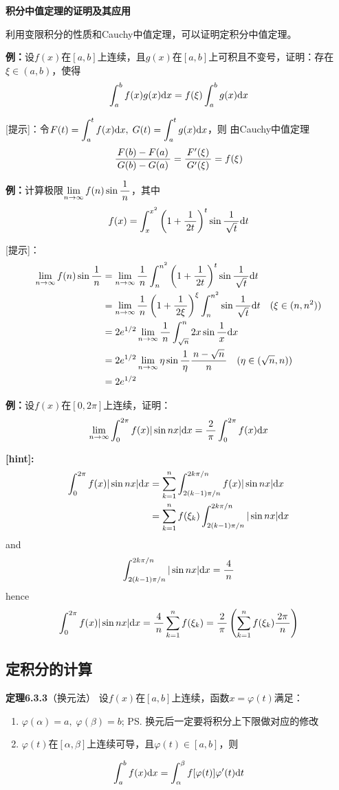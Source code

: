 \begin{shaded}
	{\bf 积分中值定理的证明及其应用}
	
	利用变限积分的性质和Cauchy中值定理，可以证明定积分中值定理。

	{\bf 例：}设$f(x)$在$[a,b]$上连续，且$g(x)$在$[a,b]$上可积且不变号，证明：存在
	$\xi\in(a,b)$，使得
	$$\dint_a^bf(x)g(x)\d x=f(\xi)\dint_a^bg(x)\d x$$
	
	[提示]：令$F(t)=\dint_a^tf(x)\d x,\;G(t)=\dint_a^tg(x)\d x$，则
	由Cauchy中值定理
	$$\df{F(b)-F(a)}{G(b)-G(a)}=\df{F'(\xi)}{G'(\xi)}=f(\xi)$$
	
	{\bf 例：}计算极限$\limn f(n)\sin\df 1n$，其中
	  $$f(x)=\dint_x^{x^2}\left(1+\df 1{2t}\right)^t\sin\df{1}{\sqrt t}\d t$$
	
	[提示]：
	\begin{align}
		\limn f(n)\sin\df 1n&=\limn\df1n\dint_n^{n^2}\left(1+\df
		1{2t}\right)^t\sin\df{1}{\sqrt t}\d t\notag\\
		&=\limn\df1n\left(1+\df1{2\xi}\right)^{\xi}\dint_n^{n^2}
		\sin\df1{\sqrt t}\d t\quad(\xi\in(n,n^2))\notag\\
		&=2e^{1/2}\limn\df1n\dint_{\sqrt n}^n2x\sin\df1x\d x\notag\\
		&=2e^{1/2}\limn\eta\sin\df1{\eta}\df{n-\sqrt n}n\quad(\eta\in(\sqrt
		n,n))\notag\\
		&=2e^{1/2}\notag
	\end{align}
	
	{\bf 例：}设$f(x)$在$[0,2\pi]$上连续，证明：
	$$\limn\dint_0^{2\pi}f(x)|\sin nx|\d x=\df 2{\pi}\dint_0^{2\pi}f(x)\d x$$
	
	{\bf [hint]:}
	\begin{align}
	\dint_0^{2\pi}f(x)|\sin nx|\d x
	&=\sum\limits_{k=1}^n\dint_{2(k-1)\pi/n}^{2k\pi/n}f(x)|\sin nx|\d x\notag\\
	&=\sum\limits_{k=1}^nf(\xi_k)\dint_{2(k-1)\pi/n}^{2k\pi/n}|\sin nx|\d x\notag
	\end{align}
	and
	$$\dint_{2(k-1)\pi/n}^{2k\pi/n}|\sin nx|\d x=\df4n$$
	hence
	$$\dint_0^{2\pi}f(x)|\sin nx|\d x=\df4n\sum\limits_{k=1}^nf(\xi_k)
	=\df2{\pi}\left(\sum\limits_{k=1}^nf(\xi_k)\df{2\pi}n\right)$$
\end{shaded}

\subsection{定积分的计算}

{\bf 定理6.3.3}（换元法）
设$f(x)$在$[a,b]$上连续，函数$x=\varphi(t)$满足：
\begin{enumerate}[(1)]
  \setlength{\itemindent}{1cm}
  \item $\varphi(\alpha)=a,\;\varphi(\beta)=b$;
  \ps{换元后一定要将积分上下限做对应的修改}
  \item $\varphi(t)$在$[\alpha,\beta]$上连续可导，且$\varphi(t)\in[a,b]$，则
\end{enumerate}
$${\dint_a^bf(x)\d
x=\dint_{\alpha}^{\beta}f[\varphi(t)]\varphi'(t)\d t}$$

